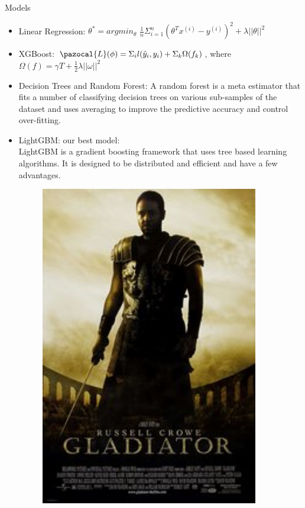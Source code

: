 \documentclass[final]{beamer}
\newlength{\onecolwid}
\newcommand{\Lb}{\pazocal{L}}
\begin{document}
\begin{frame}[t]
\begin{columns}[t]
\begin{column}{\onecolwid}
\begin{block}{Models}
\begin{itemize}
\item Linear Regression: $\theta^* = argmin_\theta$ $\frac{1}{n} \Sigma_{i=1}^{n}
(\theta^Tx^{(i)} - y^{(i)})^2 + \lambda||\theta||^2$

\item XGBoost: $\Lb (\phi) = \Sigma_i l(\hat{y}_i, y_i) + \Sigma_k \Omega (f_k) $, where  $\Omega (f) = \gamma T + \frac{1}{2}\lambda ||\omega||^2 $

\item Decision Trees and Random Forest: A random forest is a meta estimator that fits a number of classifying decision trees on various sub-samples of the dataset and uses averaging to improve the predictive accuracy and control over-fitting.

\item LightGBM: our best model: \\
LightGBM is a gradient boosting framework that uses tree based learning algorithms. It is designed to be distributed and efficient and have a few advantages.


\begin{minipage}{0.3\textwidth}
\begin{figure}[H]
\includegraphics[width=0.9\textwidth]{172495.jpg}
\end{figure}


\end{minipage}
\end{itemize}
\end{block}
\end{column}
\end{columns}
\end{frame}
\end{document}
